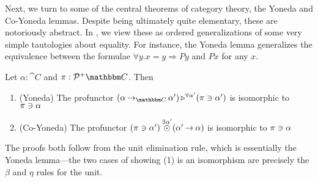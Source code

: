 \documentclass{llncs}
\begin{document}
Next, we turn to some of the central theorems of category theory, the
Yoneda and Co-Yoneda lemmas. Despite being ultimately quite
elementary, these are notoriously abstract. In \ohol{}, we view these
as ordered generalizations of some very simple tautologies about
equality. For instance, the Yoneda lemma generalizes the equivalence
between the formulae $\forall y. x = y \Rightarrow P y$ and $P x$ for
any $x$.
\begin{lemma} \label{lem:yoneda}
  Let $\alpha : \cat C$ and $\pi : \posPresheaf {\cat C}$. Then
  \begin{enumerate}
  \item (Yoneda) The profunctor 
    $\homrallXYtoZ {\alpha'} {(\punitinXfromYtoZ {\cat C} {\alpha}{\alpha'})} {(\posPresheafAppPtoX \pi {\alpha'})}$ is isomorphic to $\posPresheafAppPtoX \pi \alpha$
  \item (Co-Yoneda) The profunctor $\tensorexistsXwithYandZ {\alpha'}{(\posPresheafAppPtoX \pi \alpha')} {(\punitinXfromYtoZ{}{\alpha'}{\alpha})}$ is isomorphic to $\posPresheafAppPtoX \pi \alpha$
  \end{enumerate}
\end{lemma}
The proofs both follow from the unit elimination rule, which is
essentially the Yoneda lemma---the two cases of showing (1) is an
isomorphism are precisely the $\beta$ and $\eta$ rules for the unit.
\end{document}
